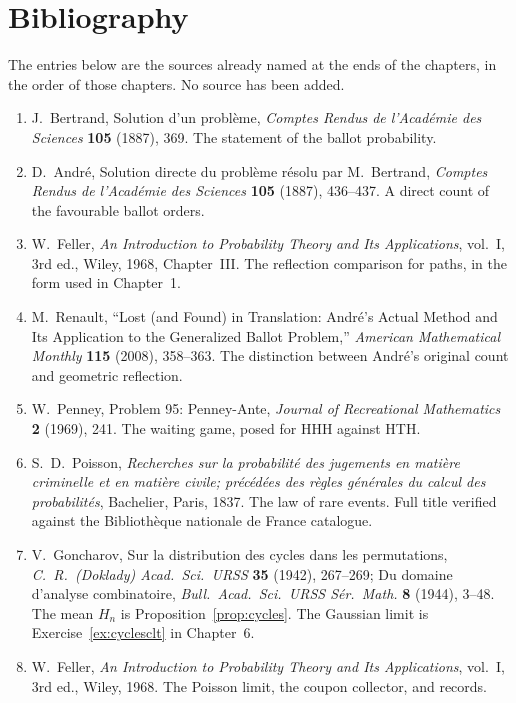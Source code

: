 \backmatter
\chapter*{Bibliography}
\noindent The entries below are the sources already named at the ends of the chapters, in the order of those chapters. No source has been added.

\begin{enumerate}
\item J.~Bertrand, Solution d'un probl\`eme, \emph{Comptes Rendus de l'Acad\'emie des Sciences} \textbf{105} (1887), 369. The statement of the ballot probability.
\item D.~Andr\'e, Solution directe du probl\`eme r\'esolu par M.~Bertrand, \emph{Comptes Rendus de l'Acad\'emie des Sciences} \textbf{105} (1887), 436--437. A direct count of the favourable ballot orders.
\item W.~Feller, \emph{An Introduction to Probability Theory and Its Applications}, vol.~I, 3rd ed., Wiley, 1968, Chapter~III. The reflection comparison for paths, in the form used in Chapter~1.
\item M.~Renault, ``Lost (and Found) in Translation: Andr\'e's Actual Method and Its Application to the Generalized Ballot Problem,'' \emph{American Mathematical Monthly} \textbf{115} (2008), 358--363. The distinction between Andr\'e's original count and geometric reflection.
\item W.~Penney, Problem 95: Penney-Ante, \emph{Journal of Recreational Mathematics} \textbf{2} (1969), 241. The waiting game, posed for HHH against HTH.
\item S.~D.~Poisson, \emph{Recherches sur la probabilit\'e des jugements en mati\`ere criminelle et en mati\`ere civile; pr\'ec\'ed\'ees des r\`egles g\'en\'erales du calcul des probabilit\'es}, Bachelier, Paris, 1837. The law of rare events. Full title verified against the Biblioth\`eque nationale de France catalogue.
\item V.~Goncharov, Sur la distribution des cycles dans les permutations, \emph{C.\ R.\ (Doklady) Acad.\ Sci.\ URSS} \textbf{35} (1942), 267--269; Du domaine d'analyse combinatoire, \emph{Bull.\ Acad.\ Sci.\ URSS S\'er.\ Math.} \textbf{8} (1944), 3--48. The mean $H_n$ is Proposition~\ref{prop:cycles}. The Gaussian limit is Exercise~\ref{ex:cyclesclt} in Chapter~6.
\item W.~Feller, \emph{An Introduction to Probability Theory and Its Applications}, vol.~I, 3rd ed., Wiley, 1968. The Poisson limit, the coupon collector, and records.

\end{enumerate}
